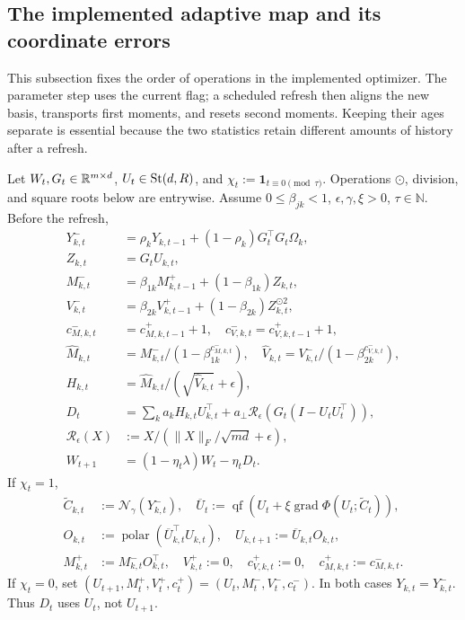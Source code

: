 \subsection{The implemented adaptive map and its coordinate errors}
This subsection fixes the order of operations in the implemented optimizer.
The parameter step uses the current flag; a scheduled refresh then aligns the
new basis, transports first moments, and resets second moments. Keeping their
ages separate is essential because the two statistics retain different
amounts of history after a refresh.

\begin{definition}\label{def:rigid-map}
Let $W_t,G_t\in\mathbb R^{m\times d}$, $U_t\in\operatorname{St}(d,R)$, and
$\chi_t:=\mathbf1_{t\equiv0\pmod\tau}$. Operations $\odot$, division, and square
roots below are entrywise. Assume $0\le\beta_{jk}<1$, $\epsilon,\gamma,\xi>0$,
$\tau\in\mathbb N$. Before the refresh,
\begin{align}
 Y_{k,t}^-&=\rho_kY_{k,t-1}+(1-\rho_k)G_t^\top G_t\Omega_k,\\
 Z_{k,t}&=G_tU_{k,t},\\
 M_{k,t}^-&=\beta_{1k}M_{k,t-1}^++(1-\beta_{1k})Z_{k,t},\\
 V_{k,t}^-&=\beta_{2k}V_{k,t-1}^++(1-\beta_{2k})Z_{k,t}^{\odot2},\\
 c_{M,k,t}^-&=c_{M,k,t-1}^++1,\quad c_{V,k,t}^-=c_{V,k,t-1}^++1,\\
 \widehat M_{k,t}&=M_{k,t}^-/(1-\beta_{1k}^{c_{M,k,t}^-}),\quad
 \widehat V_{k,t}=V_{k,t}^-/(1-\beta_{2k}^{c_{V,k,t}^-}),\\
 H_{k,t}&=\widehat M_{k,t}/(\sqrt{\widehat V_{k,t}}+\epsilon),\\
 D_t&=\sum_k a_kH_{k,t}U_{k,t}^\top+
   a_\perp\mathcal R_\epsilon(G_t(I-U_tU_t^\top)),
 \label{eq:rigid-direction}\\
 \mathcal R_\epsilon(X)&:=X/(\|X\|_F/\sqrt{md}+\epsilon),\\
 W_{t+1}&=(1-\eta_t\lambda)W_t-\eta_tD_t.
\end{align}
If $\chi_t=1$,
\begin{align}
 \widetilde C_{k,t}&:=\mathcal N_\gamma(Y_{k,t}^-),\quad
 \overline U_t:=\operatorname{qf}(U_t+\xi\operatorname{grad}\Phi(U_t;\widetilde C_t)),\\
 O_{k,t}&:=\operatorname{polar}(\overline U_{k,t}^\top U_{k,t}),\quad
 U_{k,t+1}:=\overline U_{k,t}O_{k,t},\\
 M_{k,t}^+&:=M_{k,t}^-O_{k,t}^\top,\quad
 V_{k,t}^+:=0,\quad c_{V,k,t}^+:=0,\quad c_{M,k,t}^+:=c_{M,k,t}^-.
\end{align}
If $\chi_t=0$, set $(U_{t+1},M_t^+,V_t^+,c_t^+)=(U_t,M_t^-,V_t^-,c_t^-)$. In both
cases $Y_{k,t}=Y_{k,t}^-$. Thus $D_t$ uses $U_t$, not $U_{t+1}$.
\end{definition}
